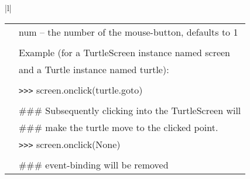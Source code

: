\begin{center}
{\begin{tabular}{|l|}
\begin{tabular}{p{0.25in}p{4in}}
&        num -- the number of the mouse-button, defaults to 1 \\
&  \\
&        Example (for a TurtleScreen instance named screen \\
&        and a Turtle instance named turtle): \\
&  \\
&        \verb+>+\verb+>+\verb+>+ screen.onclick(turtle.goto) \\
&  \\
&        \#\#\# Subsequently clicking into the TurtleScreen will \\
&        \#\#\# make the turtle move to the clicked point. \\
&        \verb+>+\verb+>+\verb+>+ screen.onclick(None) \\
&  \\
&        \#\#\# event-binding will be removed \\
\end{tabular} \\ \hline



\end{tabular}}
\end{center}
